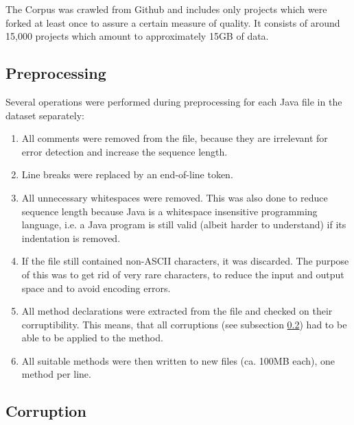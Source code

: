 The Corpus was crawled from Github and includes only projects which were forked at least once to assure a certain measure of quality. It consists of around 15,000 projects which amount to approximately 15GB of data.

\subsection{Preprocessing}

Several operations were performed during preprocessing for each Java file in the dataset separately:

\begin{enumerate}
  \item All comments were removed from the file, because they are irrelevant for error detection and increase the sequence length.
  \item Line breaks were replaced by an end-of-line token.
  \item All unnecessary whitespaces were removed. This was also done to reduce sequence length because Java is a whitespace insensitive programming language, i.e. a Java program is still valid (albeit harder to understand) if its indentation is removed.
  \item If the file still contained non-ASCII characters, it was discarded. The purpose of this was to get rid of very rare characters, to reduce the input and output space and to avoid encoding errors.
  \item All method declarations were extracted from the file and checked on their corruptibility. This means, that all corruptions (see subsection \ref{corruption}) had to be able to be applied to the method.
  \item All suitable methods were then written to new files (ca. 100MB each), one method per line.
\end{enumerate}

\subsection{Corruption}
\label{corruption}

